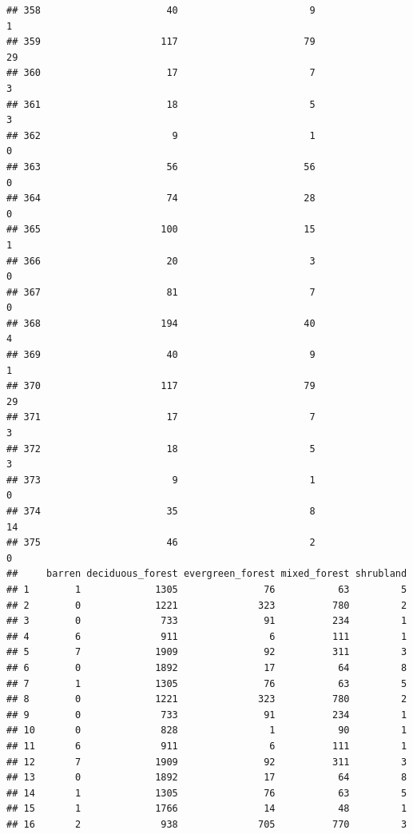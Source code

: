 \documentclass[
]{article}
\begin{document}
\begin{verbatim}
## 358                      40                       9                        1
## 359                     117                      79                       29
## 360                      17                       7                        3
## 361                      18                       5                        3
## 362                       9                       1                        0
## 363                      56                      56                        0
## 364                      74                      28                        0
## 365                     100                      15                        1
## 366                      20                       3                        0
## 367                      81                       7                        0
## 368                     194                      40                        4
## 369                      40                       9                        1
## 370                     117                      79                       29
## 371                      17                       7                        3
## 372                      18                       5                        3
## 373                       9                       1                        0
## 374                      35                       8                       14
## 375                      46                       2                        0
##     barren deciduous_forest evergreen_forest mixed_forest shrubland
## 1        1             1305               76           63         5
## 2        0             1221              323          780         2
## 3        0              733               91          234         1
## 4        6              911                6          111         1
## 5        7             1909               92          311         3
## 6        0             1892               17           64         8
## 7        1             1305               76           63         5
## 8        0             1221              323          780         2
## 9        0              733               91          234         1
## 10       0              828                1           90         1
## 11       6              911                6          111         1
## 12       7             1909               92          311         3
## 13       0             1892               17           64         8
## 14       1             1305               76           63         5
## 15       1             1766               14           48         1
## 16       2              938              705          770         3

\end{verbatim}
\end{document}
